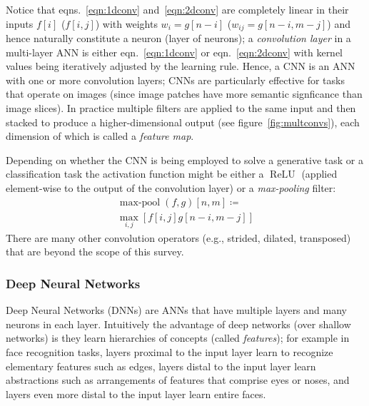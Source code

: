 Notice that eqns.~\eqref{eqn:1dconv} and~\eqref{eqn:2dconv} are completely linear in their inputs \(f[i]\) (\(f[i,j]\)) with weights \(w_i = g[n-i]\) (\(w_{ij} = g[n-i, m-j]\)) and hence naturally constitute a neuron (layer of neurons); a \textit{convolution layer} in a multi-layer ANN is either eqn.~\eqref{eqn:1dconv} or eqn.~\eqref{eqn:2dconv} with kernel values being iteratively adjusted by the learning rule.
%
Hence, a CNN is an ANN with one or more convolution layers; CNNs are particularly effective for tasks that operate on images (since image patches have more semantic signficance than image slices).
%
In practice multiple filters are applied to the same input and then stacked to produce a higher-dimensional output (see figure~\ref{fig:multconvs}), each dimension of which is called a \textit{feature map}.

%
Depending on whether the CNN is being employed to solve a generative task or a classification task the activation function might be either a \(\operatorname{ReLU}\) (applied element-wise to the output of the convolution layer) or a \textit{max-pooling} filter:
\begin{multline}
    \operatorname{max-pool}(f,g)[n, m]\coloneqq\\ \max_{i,j}\left[ f[i, j]g[n-i, m-j] \right]
    \label{eqn:2dpool}
\end{multline}
There are many other convolution operators (e.g., strided, dilated, transposed) that are beyond the scope of this survey\cite{dumoulin2016guide}.

\subsubsection{Deep Neural Networks}

%
Deep Neural Networks (DNNs) are ANNs that have multiple layers and many neurons in each layer.
%
Intuitively the advantage of deep networks (over shallow networks) is they learn hierarchies of concepts (called \textit{features}); for example in face recognition tasks, layers proximal to the input layer learn to recognize elementary features such as edges, layers distal to the input layer learn abstractions such as arrangements of features that comprise eyes or noses, and layers even more distal to the input layer learn entire faces.

